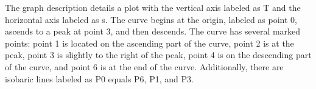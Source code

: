 The graph description details a plot with the vertical axis labeled as T and the horizontal axis labeled as s. The curve begins at the origin, labeled as point 0, ascends to a peak at point 3, and then descends. The curve has several marked points: point 1 is located on the ascending part of the curve, point 2 is at the peak, point 3 is slightly to the right of the peak, point 4 is on the descending part of the curve, and point 6 is at the end of the curve. Additionally, there are isobaric lines labeled as P0 equals P6, P1, and P3.